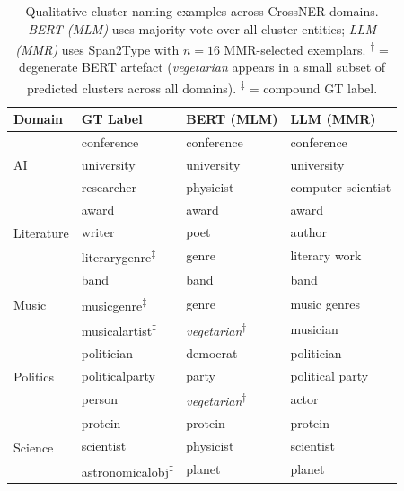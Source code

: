 \begin{table}[ht]
\centering
\footnotesize
\caption{Qualitative cluster naming examples across CrossNER domains.
\textit{BERT (MLM)} uses majority-vote over all cluster entities;
\textit{LLM (MMR)} uses Span2Type with $n{=}16$ MMR-selected exemplars.
\textsuperscript{$\dagger$} = degenerate BERT artefact (\textit{vegetarian} appears in a small subset of predicted clusters across all domains).
\textsuperscript{$\ddagger$} = compound GT label.}
\label{tab:naming_examples}
\setlength{\tabcolsep}{4pt}
\begin{tabular}{l l l l}
\toprule
\textbf{Domain} & \textbf{GT Label} & \textbf{BERT (MLM)} & \textbf{LLM (MMR)} \\
\midrule
\multirow{3}{*}{AI}
  & conference        & conference              & conference \\
  & university        & university              & university \\
  & researcher        & physicist               & computer scientist \\
\midrule
\multirow{3}{*}{Literature}
  & award             & award                   & award \\
  & writer            & poet                    & author \\
  & literarygenre\textsuperscript{$\ddagger$} & genre & literary work \\
\midrule
\multirow{3}{*}{Music}
  & band              & band                    & band \\
  & musicgenre\textsuperscript{$\ddagger$}    & genre & music genres \\
  & musicalartist\textsuperscript{$\ddagger$} & \textit{vegetarian}\textsuperscript{$\dagger$} & musician \\
\midrule
\multirow{3}{*}{Politics}
  & politician        & democrat                & politician \\
  & politicalparty    & party                   & political party \\
  & person            & \textit{vegetarian}\textsuperscript{$\dagger$} & actor \\
\midrule
\multirow{3}{*}{Science}
  & protein           & protein                 & protein \\
  & scientist         & physicist               & scientist \\
  & astronomicalobj\textsuperscript{$\ddagger$} & planet & planet \\
\bottomrule
\end{tabular}
\end{table}
